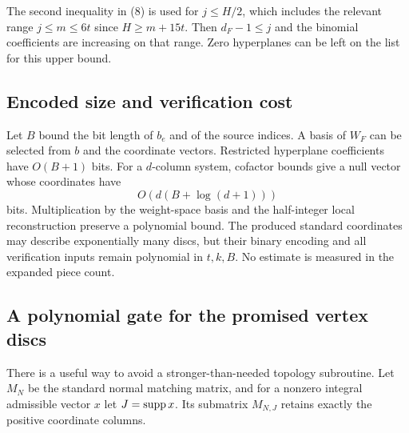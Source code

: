 \begin{remark}
The second inequality in (8) is used for $j\le H/2$, which includes the
relevant range $j\le m\le6t$ since $H\ge m+15t$. Then
$d_F-1\le j$ and the binomial coefficients are increasing on that range.
Zero hyperplanes can be left on the list for this upper bound.
\end{remark}

\subsection{Encoded size and verification cost}

Let $B$ bound the bit length of $b_e$ and of the source indices. A basis of
$W_F$ can be selected from $b$ and the coordinate vectors. Restricted
hyperplane coefficients have $O(B+1)$ bits. For a $d$-column system,
cofactor bounds give a null vector whose coordinates have
\[
                         O(d(B+\log(d+1)))                 \tag{9}\label{eq:bits}
\]
bits. Multiplication by the weight-space basis and the half-integer local
reconstruction preserve a polynomial bound. The produced standard
coordinates may describe exponentially many discs, but their binary
encoding and all verification inputs remain polynomial in $t,k,B$.
No estimate is measured in the expanded piece count.

\subsection{A polynomial gate for the promised vertex discs}

There is a useful way to avoid a stronger-than-needed topology subroutine.
Let $M_{\!N}$ be the standard normal matching matrix, and for a nonzero
integral admissible vector $x$ let $J=\operatorname{supp} x$. Its submatrix
$M_{\!N,J}$ retains exactly the positive coordinate columns.

